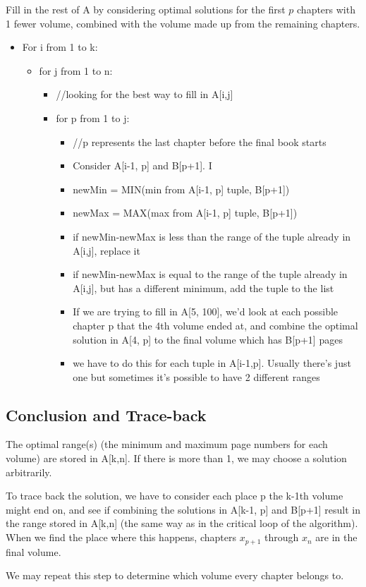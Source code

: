\documentclass[a4paper]{article}
\begin{document}
Fill in the rest of A by considering optimal solutions for the first $p$ chapters with 1 fewer volume, combined with the volume made up from the remaining chapters.
\begin{itemize}
    \item For i from 1 to k:
    \begin{itemize}
        \item for j from 1 to n:
        \begin{itemize}
            \item //looking for the best way to fill in A[i,j]
            \item for p from 1 to j:
            \begin{itemize}
                \item //p represents the last chapter before the final book starts
                \item Consider A[i-1, p] and B[p+1]. I
                \item newMin = MIN(min from A[i-1, p] tuple, B[p+1])
                \item newMax = MAX(max from A[i-1, p] tuple, B[p+1])
                \item if newMin-newMax is less than the range of the tuple already in A[i,j], replace it
                \item if newMin-newMax is equal to the range of the tuple already in A[i,j], but has a different minimum, add the tuple to the list
                \item If we are trying to fill in A[5, 100], we'd look at each possible chapter p that the 4th volume ended at, and combine the optimal solution in A[4, p] to the final volume which has B[p+1] pages
                \item we have to do this for each tuple in A[i-1,p]. Usually there's just one but sometimes it's possible to have 2 different ranges 
            \end{itemize}
        \end{itemize}
    \end{itemize}
\end{itemize}


\subsection{Conclusion and Trace-back}
The optimal range(s) (the minimum and maximum page numbers for each volume) are stored in A[k,n]. If there is more than 1, we may choose a solution arbitrarily.

To trace back the solution, we have to consider each place p the k-1th volume might end on, and see if combining the solutions in A[k-1, p] and B[p+1] result in the range stored in A[k,n] (the same way as in the critical loop of the algorithm). When we find the place where this happens, chapters $x_{p+1}$ through $x_n$ are in the final volume.

We may repeat this step to determine which volume every chapter belongs to.
\end{document}
